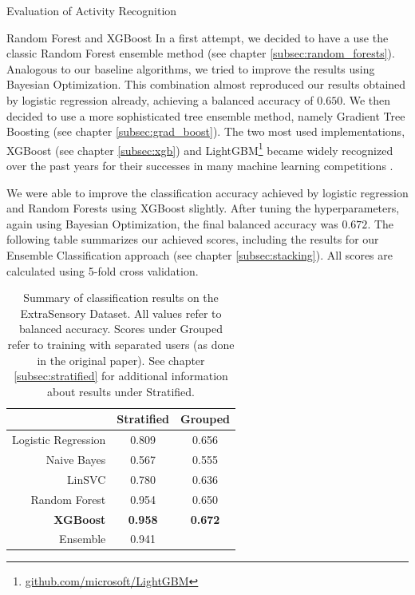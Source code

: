 \begin{section}{Evaluation of Activity Recognition}
	\begin{subsection}{Random Forest and XGBoost}
		In a first attempt, we decided to have a use the classic Random Forest ensemble method (see chapter \ref{subsec:random_forests}). Analogous to our baseline algorithms, we tried to improve the results using Bayesian Optimization. This combination almost reproduced our results obtained by logistic regression already, achieving a balanced accuracy of $0.650$. We then decided to use a more sophisticated tree ensemble method, namely Gradient Tree Boosting (see chapter \ref{subsec:grad_boost}). The two most used implementations, XGBoost (see chapter \ref{subsec:xgb}) and LightGBM\footnote{\href{https://github.com/microsoft/LightGBM}{github.com/microsoft/LightGBM}} became widely recognized over the past years for their successes in many machine learning competitions \cite{Chen16}. \par
		We were able to improve the classification accuracy achieved by logistic regression and Random Forests using XGBoost slightly. After tuning the hyperparameters, again using Bayesian Optimization, the final balanced accuracy was $0.672$.  The following table summarizes our achieved scores, including the results for our Ensemble Classification approach (see chapter \ref{subsec:stacking}). All scores are calculated using 5-fold cross validation.
		\begin{table}[H]
			\begin{center} 
				\caption{Summary of classification results on the ExtraSensory Dataset. All values refer to balanced accuracy. Scores under \glqq Grouped\grqq{} refer to training with separated users (as done in the original paper). See chapter \ref{subsec:stratified} for additional information about results under \glqq Stratified\grqq.}
				\begin{tabular}{r|c|c}
					\toprule
					& Stratified & Grouped \\
					\midrule
					Logistic Regression & 0.809 & 0.656 \\
					Naive Bayes & 0.567 & 0.555 \\
					LinSVC & 0.780 & 0.636 \\
					Random Forest & 0.954 & 0.650 \\
					\textbf{XGBoost} & \textbf{0.958} & \textbf{0.672} \\
					\midrule
					Ensemble & 0.941 & \\
					\bottomrule
				\end{tabular}
			\end{center}
			\label{table:results}
		\end{table}
	\end{subsection}


\end{section}
